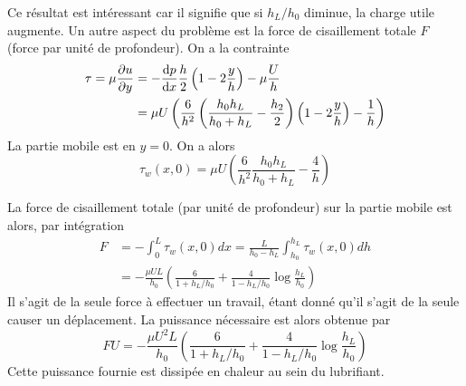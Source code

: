     Ce résultat est intéressant car il signifie que si $h_L/h_0$ diminue, la charge utile augmente. Un autre aspect du problème est la force de cisaillement totale $F$ (force par unité de profondeur). On a la contrainte
    \begin{equation}
      \begin{aligned}
        \tau = \mu \pdv{u}{y} &= -\dv{p}{x} \frac{h}{2} \left(1 - 2\frac{y}{h}\right) -\mu \frac{U}{h}\\
        &= \mu U \left(\frac{6}{h^2}\left(\frac{h_0 h_L}{h_0 + h_L} - \frac{h_2}{2}\right)\left(1- 2\frac{y}{h}\right) - \frac{1}{h}\right)
      \end{aligned}
    \end{equation}
    La partie mobile est en $y=0$. On a alors
    \begin{equation}
      \tau_w (x, 0) = \mu U\left(\frac{6}{h^2} \frac{h_0 h_L}{h_0 + h_L} - \frac{4}{h}\right)
    \end{equation}

    La force de cisaillement totale (par unité de profondeur) sur la partie mobile est alors, par intégration
    \begin{equation}
      \begin{aligned}
          F &= -\int_0^L \tau_w (x, 0) dx = \frac{L}{h_0 - h_L} \int_{h_0}^{h_L} \tau_w(x, 0) dh\\
          &= - \frac{\mu U L}{h_0} \left(\frac{6}{1+h_L/h_0} + \frac{4}{1-h_L/h_0}\log\frac{h_L}{h_0}\right)
      \end{aligned}
    \end{equation}
    Il s'agit de la seule force à effectuer un travail, étant donné qu'il s'agit de la seule causer un déplacement. La puissance nécessaire est alors obtenue par
    \begin{equation}
      F U = -\frac{\mu U^2L}{h_0} \left(\frac{6}{1+h_L/h_0} + \frac{4}{1-h_L/h_0}\log\frac{h_L}{h_0}\right)
    \end{equation}
    Cette puissance fournie est dissipée en chaleur au sein du lubrifiant.
